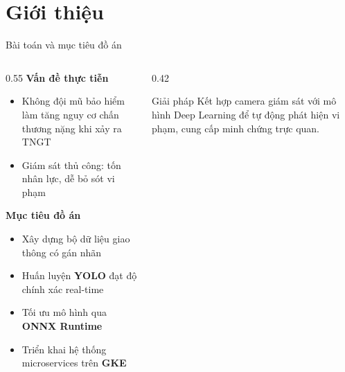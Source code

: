 \section{Giới thiệu}

\begin{frame}{Bài toán và mục tiêu đồ án}

\begin{columns}[T]
\begin{column}{0.55\textwidth}
  \textbf{Vấn đề thực tiễn}\footnotesize
  \begin{itemize}
    \item Không đội mũ bảo hiểm làm tăng nguy cơ chấn thương nặng khi xảy ra TNGT
    \item Giám sát thủ công: tốn nhân lực, dễ bỏ sót vi phạm
  \end{itemize}
  \normalsize\vspace{0.2em}
  \textbf{Mục tiêu đồ án}\footnotesize
  \begin{itemize}
    \item Xây dựng bộ dữ liệu giao thông có gán nhãn
    \item Huấn luyện \textbf{YOLO} đạt độ chính xác real-time
    \item Tối ưu mô hình qua \textbf{ONNX Runtime}
    \item Triển khai hệ thống microservices trên \textbf{GKE}
  \end{itemize}
\end{column}
\begin{column}{0.42\textwidth}
  \begin{block}{Giải pháp}
    \small Kết hợp camera giám sát với mô hình Deep Learning để tự động phát hiện vi phạm, cung cấp minh chứng trực quan.
  \end{block}
\end{column}
\end{columns}

\end{frame}

